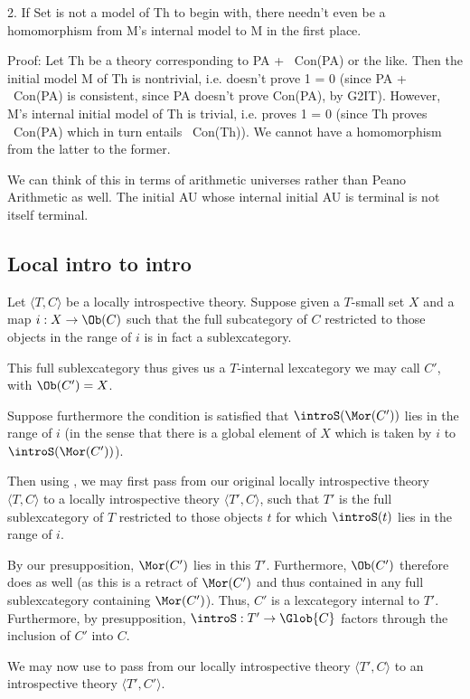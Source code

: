 \begin{TODOblock}
2. If Set is not a model of Th to begin with, there needn't even be a homomorphism from M's internal model to M in the first place.

Proof: Let Th be a theory corresponding to PA + ~Con(PA) or the like. Then the initial model M of Th is nontrivial, i.e. doesn't prove 1 = 0 (since PA + ~Con(PA) is consistent, since PA doesn't prove Con(PA), by G2IT). However, M's internal initial model of Th is trivial, i.e. proves 1 = 0 (since Th proves ~Con(PA) which in turn entails ~Con(Th)). We cannot have a homomorphism from the latter to the former.

We can think of this in terms of arithmetic universes rather than Peano Arithmetic as well. The initial AU whose internal initial AU is terminal is not itself terminal.
\end{TODOblock}

\subsection{Local intro to intro}
\begin{construction}
Let $\langle T, C \rangle$ be a locally introspective theory. Suppose given a $T$-small set $X$ and a map $i : X \to \Ob(C)$ such that the full subcategory of $C$ restricted to those objects in the range of $i$ is in fact a sublexcategory.

This full sublexcategory thus gives us a $T$-internal lexcategory we may call $C'$, with $\Ob(C') = X$.

Suppose furthermore the condition is satisfied that $\introS(\Mor(C'))$ lies in the range of $i$ (in the sense that there is a global element of $X$ which is taken by $i$ to $\introS(\Mor(C'))$).

Then using , we may first pass from our original locally introspective theory $\langle T, C \rangle$ to a locally introspective theory $\langle T', C \rangle$, such that $T'$ is the full sublexcategory of $T$ restricted to those objects $t$ for which $\introS(t)$ lies in the range of $i$.

By our presupposition, $\Mor(C')$ lies in this $T'$. Furthermore, $\Ob(C')$ therefore does as well (as this is a retract of $\Mor(C')$ and thus contained in any full sublexcategory containing $\Mor(C')$). Thus, $C'$ is a lexcategory internal to $T'$. Furthermore, by presupposition, $\introS : T' \to \Glob{C}$ factors through the inclusion of $C'$ into $C$.

We may now use  to pass from our locally introspective theory $\langle T', C \rangle$ to an introspective theory $\langle T', C' \rangle$.
\end{construction}

